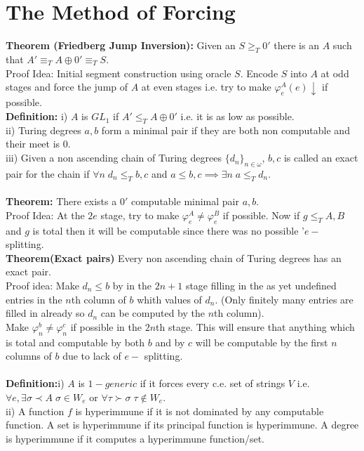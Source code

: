 \documentclass{article}
\begin{document}
   \section{The Method of Forcing}
   \textbf{Theorem (Friedberg Jump Inversion):} Given an $S \geq_T 0'$ there is an $A$ such that $A' \equiv_T A \oplus 0' \equiv_T S$.\\
   Proof Idea: Initial segment construction using oracle $S$. Encode $S$ into $A$ at odd stages and force the jump of $A$ at even stages i.e. try to make $\varphi_e^A(e)\downarrow$ if possible.\\
   \textbf{Definition:} i) $A$ is $GL_1$ if $A' \leq_T A \oplus 0'$ i.e. it is as low as possible.\\
   ii) Turing degrees $a,b$ form a minimal pair if they are both non computable and their meet is $0$.\\
   iii) Given a non ascending chain of Turing degrees $\{d_n\}_{n\in \omega}$, $b,c$ is called an exact pair for the chain if $\forall n\; d_n \leq_T b,c$ and  $a \leq b,c \implies \exists n \; a \leq_Td_n$.
  \\
  \\
  \textbf{Theorem:} There exists a $0'$ computable minimal pair $a,b$.
   \\
  Proof Idea: At the $2e$ stage, try to make $\varphi^A_e \neq \varphi_e^B$ if possible. Now if $g \leq_T A,B$ and $g$ is total then it will be computable since there was no possible '$e -$ splitting.\\
  \textbf{Theorem(Exact pairs)} Every non ascending chain of Turing degrees has an exact pair.\\
  Proof idea: Make $d_n \leq b$ by in the $2n+1$ stage filling in the as yet undefined entries in the $n$th column of $b$ whith values of $d_n$. (Only finitely many entries are filled in already so $d_n $ can be computed by the $n$th column).\\
  Make $\varphi_n^b \neq \varphi_n^c$ if possible in the $2n$th stage. This will ensure that anything which is total and computable by both $b$ and by $c$ will be computable by the first $n$ columns of $b$ due to lack of $e-$ splitting.\\
  \\
  \textbf{Definition:}i) $A$ is $1- generic$ if it forces every c.e. set of strings $V$ i.e. $\forall e, \exists \sigma \prec A \; \sigma \in W_e $ or $\forall \tau \succ \sigma \; \tau \not \in W_e$.\\
  ii) A function $f$ is hyperimmune if it is not dominated by any computable function. A set is hyperimmune if its principal function is hyperimmune. A degree is hyperimmune if it computes a hyperimmune function/set.\\
\end{document}
